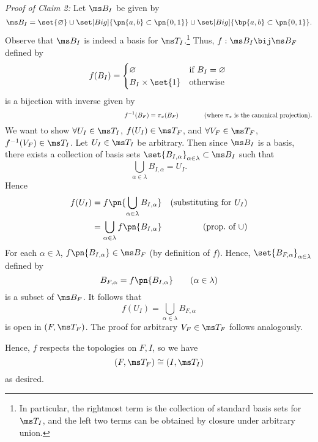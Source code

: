 \documentclass{fkpset}
\begin{document}
\begin{solution}
    \emph{Proof of Claim 2:} Let $\ms B_I$ be given by
    \[
      \ms B_I = \set{\varnothing} \cup \set[Big]{\pn{a,b} \subset
        \pn{0,1}} \cup \set[Big]{\bp{a,b} \subset \pn{0,1}}.
    \]
    Observe that $\ms B_I$ is indeed a basis for $\ms
    T_I$.\footnote{In particular, the rightmost term is the collection
      of standard basis sets for $\ms T_I$, and the left two terms can
      be obtained by closure under arbitrary union.} Thus, $f : \ms
    B_I \bij \ms B_F$ defined by
    \[
      f(B_I) =
      \begin{cases}
        \varnothing & \text{if } B_I = \varnothing \\
        B_I \times \set{1} & \text{otherwise }
      \end{cases}
    \]
    is a bijection with inverse given by
    \[
      \hspace{6.5cm}f^{-1}(B_F) = \pi_x(B_F) \qquad \qquad
      \text{(where $\pi_x$ is the canonical projection).}
    \]
    We want to show $\forall U_I\in \ms T_I$, $f(U_I) \in \ms T_F$,
    and $\forall V_F \in \ms T_F$, $f^{-1}(V_F) \in \ms T_I$. Let $U_I
    \in \ms T_I$ be arbitrary. Then since $\ms B_I$ is a basis, there
    exists a collection of basis sets $\set{B_{I, \alpha}}_{\alpha \in
      \lambda} \subset \ms B_I$ such that
    \[
      \bigcup_{\alpha \in \lambda} B_{I,\alpha} = U_I.
    \]
    Hence
    \begin{align*}
      f(U_I)
      &= f\pn{
        \bigcup_{\alpha \in \lambda} B_{I,\alpha} } & (\text{substituting for $U_I$})\\
      &= \bigcup_{\alpha \in \lambda} f\pn{B_{I,\alpha}} & \text{(prop.\ of $\cup$)}
    \end{align*}
    For each $\alpha \in \lambda$, $f\pn{B_{I,\alpha}} \in \ms B_F$
    (by definition of $f$). Hence, $\set{B_{F,\alpha}}_{\alpha \in
      \lambda}$ defined by
    \[
      B_{F,\alpha} = f\pn{B_{I,\alpha}} \qquad (\alpha \in \lambda)
    \]
    is a subset of $\ms B_F$. It follows that
    \[
      f(U_I) = \bigcup_{\alpha \in \lambda} B_{F,\alpha}
    \]
    is open in $(F, \ms T_F)$. The proof for arbitrary $V_F \in \ms
    T_F$ follows analogously.

    Hence, $f$ respects the topologies on $F,I$, so we have
    \[
      (F, \ms T_F) \cong (I, \ms T_I)
    \]
    as desired.
  \end{solution}
  \clearpage

\end{document}
